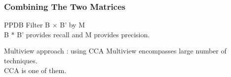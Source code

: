 \documentclass{beamer}
\begin{document}

\begin{frame}
\frametitle{Combining The Two Matrices}
\begin{block}{PPDB}
  Filter B $\times$ B' by M \\
  B * B' provides recall and M provides precision.
\end{block}

\begin{block}{Multiview approach : using CCA}
  Multiview encompasses large number of techniques.\\
  CCA is one of them.
\end{block}
\end{frame}
\end{document}
